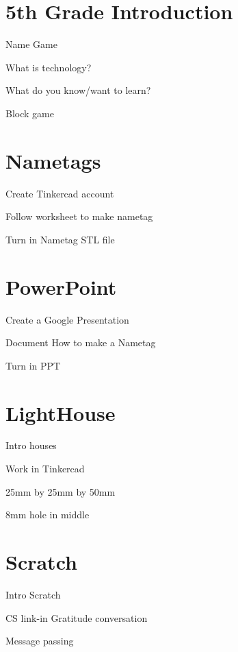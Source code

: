\documentclass{article}
\begin{document}
\def\FifthGradeone{Nametags}
\def\FifthGradetwo{PowerPoint}
\def\FifthGradeThree{LightHouse}
\def\FifthGradeFour{Scratch}
\def\FifthGradeFive{Microbit}
\def\FifthGradeSix{PrintRobots}
\def\FifthGradeSeven{MicoBots}
\def\FifthGradeEight{OldWestTrains}

\newpage
\section{5th Grade Introduction}
\begin{todolist}
	\item Name Game
	\item What is technology?
	\item What do you know/want to learn?
	\item Block game
\end{todolist}
\section{\FifthGradeone}
\begin{todolist}
	\item Create Tinkercad account
	\item Follow worksheet to make nametag
	\item Turn in Nametag STL file
\end{todolist}
\section{\FifthGradetwo}
\begin{todolist}
	\item Create a Google Presentation
	\item Document How to make a Nametag
	\item Turn in PPT
\end{todolist}
\section{\FifthGradeThree}
\begin{todolist}
	\item Intro houses
	\item Work in Tinkercad
	\item 25mm by 25mm by 50mm
	\item 8mm hole in middle 
\end{todolist}
\section{\FifthGradeFour}
\begin{todolist}
	\item Intro Scratch
	\item CS link-in Gratitude conversation
	\item Message passing
\end{todolist}
\end{document}
